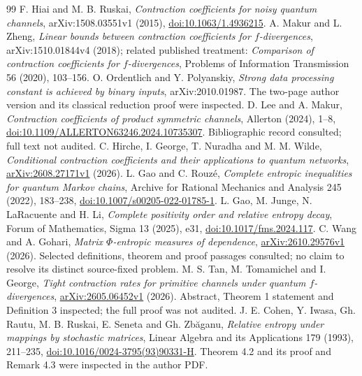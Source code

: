 \documentclass[11pt]{article}
\theoremstyle{remark}\newtheorem{remark}[theorem]{Remark}
\begin{document}
\clearpage
\begin{thebibliography}{99}
 F. Hiai and M. B. Ruskai, \emph{Contraction coefficients for noisy quantum channels}, arXiv:1508.03551v1 (2015), \href{https://doi.org/10.1063/1.4936215}{doi:10.1063/1.4936215}.
 A. Makur and L. Zheng, \emph{Linear bounds between contraction coefficients for $f$-divergences}, arXiv:1510.01844v4 (2018); related published treatment: \emph{Comparison of contraction coefficients for $f$-divergences}, Problems of Information Transmission 56 (2020), 103--156.
 O. Ordentlich and Y. Polyanskiy, \emph{Strong data processing constant is achieved by binary inputs}, arXiv:2010.01987. The two-page author version and its classical reduction proof were inspected.
 D. Lee and A. Makur, \emph{Contraction coefficients of product symmetric channels}, Allerton (2024), 1--8, \href{https://doi.org/10.1109/ALLERTON63246.2024.10735307}{doi:10.1109/ALLERTON63246.2024.10735307}. Bibliographic record consulted; full text not audited.
 C. Hirche, I. George, T. Nuradha and M. M. Wilde, \emph{Conditional contraction coefficients and their applications to quantum networks}, \href{https://arxiv.org/abs/2608.27171v1}{arXiv:2608.27171v1} (2026).
 L. Gao and C. Rouz\'e, \emph{Complete entropic inequalities for quantum Markov chains}, Archive for Rational Mechanics and Analysis 245 (2022), 183--238, \href{https://doi.org/10.1007/s00205-022-01785-1}{doi:10.1007/s00205-022-01785-1}.
 L. Gao, M. Junge, N. LaRacuente and H. Li, \emph{Complete positivity order and relative entropy decay}, Forum of Mathematics, Sigma 13 (2025), e31, \href{https://doi.org/10.1017/fms.2024.117}{doi:10.1017/fms.2024.117}.
 C. Wang and A. Gohari, \emph{Matrix $\Phi$-entropic measures of dependence}, \href{https://arxiv.org/abs/2610.29576v1}{arXiv:2610.29576v1} (2026). Selected definitions, theorem and proof passages consulted; no claim to resolve its distinct source-fixed problem.
 M. S. Tan, M. Tomamichel and I. George, \emph{Tight contraction rates for primitive channels under quantum $f$-divergences}, \href{https://arxiv.org/abs/2605.06452v1}{arXiv:2605.06452v1} (2026). Abstract, Theorem 1 statement and Definition 3 inspected; the full proof was not audited.
 J. E. Cohen, Y. Iwasa, Gh. Rautu, M. B. Ruskai, E. Seneta and Gh. Zb\u aganu, \emph{Relative entropy under mappings by stochastic matrices}, Linear Algebra and its Applications 179 (1993), 211--235, \href{https://doi.org/10.1016/0024-3795(93)90331-H}{doi:10.1016/0024-3795(93)90331-H}. Theorem 4.2 and its proof and Remark 4.3 were inspected in the author PDF.

\end{thebibliography}
\end{document}
